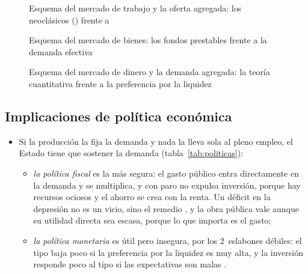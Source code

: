 \documentclass[11pt]{article}
\begin{document}
\begin{figure}[H]
\centering
\caption{Esquema del mercado de trabajo y la oferta agregada: los neoclásicos () frente a }\label{fig:hoja-trabajo}
\end{figure}

\begin{figure}[H]
\centering
\caption{Esquema del mercado de bienes: los fondos prestables frente a la demanda efectiva}\label{fig:hoja-bienes}
\end{figure}

\begin{figure}[H]
\centering
\caption{Esquema del mercado de dinero y la demanda agregada: la teoría cuantitativa frente a la preferencia por la liquidez}\label{fig:hoja-dinero}
\end{figure}

\subsection{Implicaciones de política económica}\label{sec:politica}

\begin{itemize}
\item Si la producción la fija la demanda y nada la lleva sola al pleno empleo, el Estado tiene que sostener la demanda (tabla~\ref{tab:politicas}):
  \begin{itemize}
  \item \emph{la política fiscal} es la más segura: el gasto público entra directamente en la demanda y se multiplica, y con paro no expulsa inversión, porque hay recursos ociosos y el ahorro se crea con la renta. Un déficit en la depresión no es un vicio, sino el remedio , y la obra pública vale aunque su utilidad directa sea escasa, porque lo que importa es el gasto\nocite{Keynes1936};
  \item \emph{la política monetaria} es útil pero insegura, por los 2~eslabones débiles: el tipo baja poco si la preferencia por la liquidez es muy alta, y la inversión responde poco al tipo si las expectativas son malas .
  \end{itemize}
\end{itemize}
\end{document}
